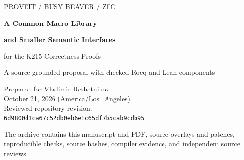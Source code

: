 \documentclass[11pt,letterpaper]{article}
\theoremstyle{definition}\newtheorem{definition}[theorem]{Definition}
\theoremstyle{remark}\newtheorem{remark}[theorem]{Remark}
\newcommand{\pin}{\texttt{6d9800d1ca67c52db0eb6e1c65df7b5cab9cdb95}}
\begin{document}
\begin{titlepage}
\vspace*{0.6in}
{\color{MidnightBlue}\large PROVEIT / BUSY BEAVER / ZFC\par}
\vspace{0.35in}
{\Huge\bfseries A Common Macro Library\par}
\vspace{0.08in}
{\Huge\bfseries and Smaller Semantic Interfaces\par}
\vspace{0.18in}
{\LARGE for the K215 Correctness Proofs\par}
\vspace{0.4in}
{\large A source-grounded proposal with checked Rocq and Lean components\par}
\vspace{0.35in}
Prepared for Vladimir Reshetnikov\\
October 21, 2026 (America/Los\_Angeles)\\[8pt]
Reviewed repository revision:\\[3pt]
\pin
\vfill
\begin{abstract}
The most useful further reduction is to make the existing macro proofs depend on a small common program interface. The maintained Rocq libraries for the dominated and command-permuted programs have identical mathematical bodies after systematic renaming. Their 58 fixed-node contracts use only 89 node definitions. We isolate that graph, compile the entire inherited macro library against it, prove a general transport theorem for the actual register-machine semantics, bind the graph to both literal programs, and check all 58 transported K215 contracts. This provides the verified core of a shared production library.

On the Lean side, we provide a checked two-file patch sharing envelopes and bounded tagged comprehension, with a net reduction of 20 lines and 899 bytes. A separate functional-seed experiment proves a constructive normalization theorem and removes an unnecessary irreflexivity hypothesis from augmented separation. Its support code currently exceeds its local line savings, so it is presented as an optional interface improvement. The report distinguishes these component checks from the repository's existing full-endpoint checks and states the remaining integration obligations explicitly.
\end{abstract}
\vfill
{\small The archive contains this manuscript and PDF, source overlays and patches, reproducible checks, source hashes, compiler evidence, and independent source reviews.}
\end{titlepage}
\end{document}
